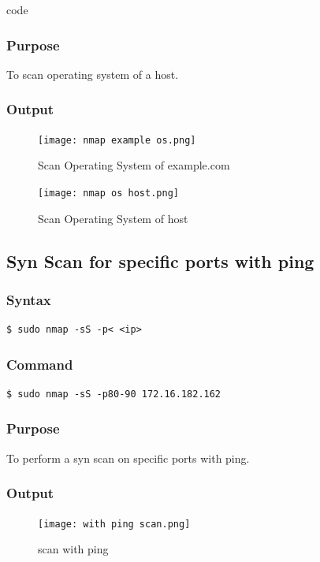 code \documentclass[11pt]{article}
\begin{document}
\subsubsection*{Purpose}
To scan operating system of a host.

\subsubsection*{Output}
\begin{figure}[H]
    \centering
    \texttt{[image: nmap example os.png]}
    \caption{Scan Operating System of example.com}
    \label{fig:1}
\end{figure}

\begin{figure}[H]
    \centering
    \texttt{[image: nmap os host.png]}
    \caption{Scan Operating System of host}
    \label{fig:1}
\end{figure}

\subsection{Syn Scan for specific ports with ping}
\subsubsection{Syntax}
\begin{verbatim}
$ sudo nmap -sS -p< <ip>
\end{verbatim}

\subsubsection*{Command}
\begin{verbatim}
$ sudo nmap -sS -p80-90 172.16.182.162
\end{verbatim}

\subsubsection*{Purpose}
To perform a syn scan on specific ports with ping.

\subsubsection*{Output}
\begin{figure}[H]
    \centering
    \texttt{[image: with ping scan.png]}
    \caption{scan with ping}
    \label{fig:1}
\end{figure}
\end{document}
